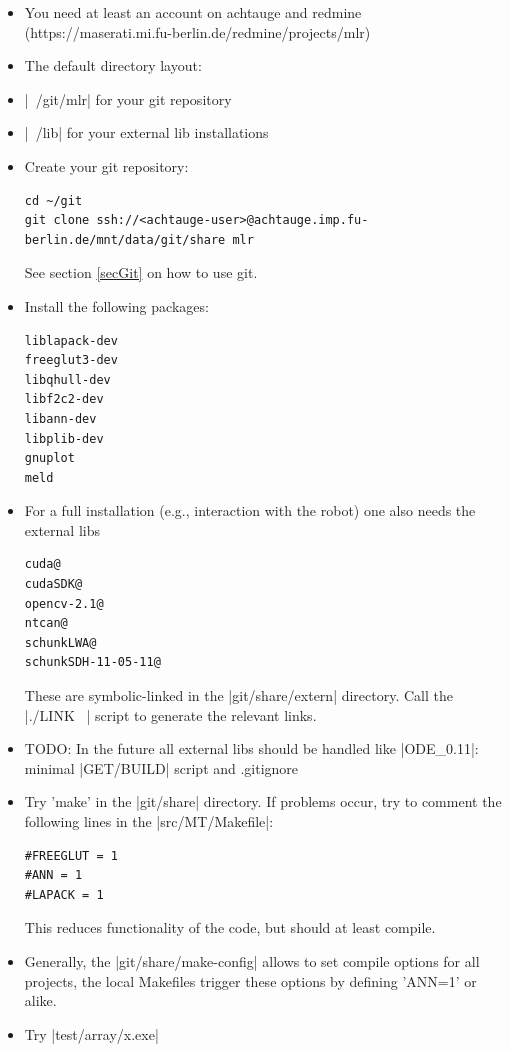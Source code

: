 \begin{itemize}
\item You need at least an account on achtauge and redmine
  (https://maserati.mi.fu-berlin.de/redmine/projects/mlr)

\item The default directory layout:
\bi
\item |~/git/mlr| for your git repository
\item |~/lib| for your external lib installations
\ei

\item Create your git repository:
\begin{code}
\begin{verbatim}
cd ~/git
git clone ssh://<achtauge-user>@achtauge.imp.fu-berlin.de/mnt/data/git/share mlr
\end{verbatim}
\end{code}
See section \ref{secGit} on how to use git.

\item Install the following packages:
\begin{code}
\begin{verbatim}
liblapack-dev
freeglut3-dev
libqhull-dev
libf2c2-dev
libann-dev
libplib-dev
gnuplot
meld
\end{verbatim}
\end{code}


\item For a full installation (e.g., interaction with the robot) one also
  needs the external libs
\begin{code}
\begin{verbatim}
cuda@
cudaSDK@
opencv-2.1@
ntcan@
schunkLWA@
schunkSDH-11-05-11@ 
\end{verbatim}
\end{code}

These are symbolic-linked in the |git/share/extern| directory. Call the
  |./LINK ~\lib| script to generate the relevant links.

\item TODO: In the future all external libs should be handled like
  |ODE_0.11|: minimal |GET/BUILD| script and .gitignore

\item Try 'make' in the |git/share| directory. If problems occur, try to
comment the following lines in the |src/MT/Makefile|:
\begin{code}
\begin{verbatim}
#FREEGLUT = 1
#ANN = 1
#LAPACK = 1
\end{verbatim}
\end{code}

This reduces functionality of the code, but should at least compile.

\item Generally, the |git/share/make-config| allows to set compile
options for all projects, the local Makefiles trigger these options by
defining 'ANN=1' or alike.

\item Try |test/array/x.exe|
\end{itemize}

